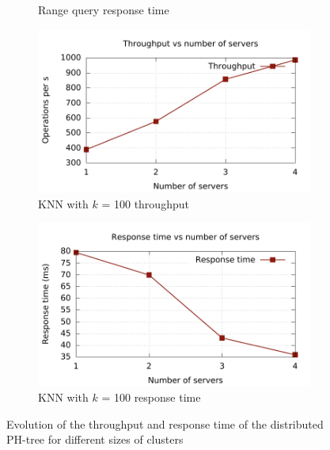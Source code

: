\documentclass[11pt,a4paper]{globis-book}
\begin{document}
\begin{figure}
\begin{subfigure}[b]{0.5\linewidth}
        \caption{Range query response time}
        \label{fig:exp-dist-range-rt} 
    \end{subfigure}
    \begin{subfigure}[b]{0.5\linewidth}
        \includegraphics[scale=0.5]{images/plots/knn-distributed-tp}
        \caption{KNN with $k$ = 100  throughput}
        \label{fig:exp-dist-knn-tp} 
    \end{subfigure}%
    \begin{subfigure}[b]{0.5\linewidth}
        \includegraphics[scale=0.5]{images/plots/knn-distributed-rt}
        \caption{KNN with $k$ = 100 response time}
        \label{fig:exp-dist-knn-rt} 
    \end{subfigure}
    \caption{Evolution of the throughput and response time of the distributed PH-tree for different sizes of clusters}
    \label{fig:exp-distributed}
\end{figure}
\end{document}
